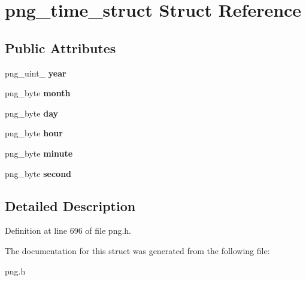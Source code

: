 \hypertarget{structpng__time__struct}{\section{png\+\_\+time\+\_\+struct Struct Reference}
\label{structpng__time__struct}
}
\subsection*{Public Attributes}
\begin{DoxyCompactItemize}
\item 
\hypertarget{structpng__time__struct_a5cceb6213fc7b4462435ea1d8fc1c798}{png\+\_\+uint\+\_ {\bfseries year}}\label{structpng__time__struct_a5cceb6213fc7b4462435ea1d8fc1c798}

\item 
\hypertarget{structpng__time__struct_a3ab550977ee2cb1165c0398131f2e601}{png\+\_\+byte {\bfseries month}}\label{structpng__time__struct_a3ab550977ee2cb1165c0398131f2e601}

\item 
\hypertarget{structpng__time__struct_afa0f94516a676178d1dabeb96eccdcdb}{png\+\_\+byte {\bfseries day}}\label{structpng__time__struct_afa0f94516a676178d1dabeb96eccdcdb}

\item 
\hypertarget{structpng__time__struct_a79ac8b217254fd87cdc7299e6612a6f4}{png\+\_\+byte {\bfseries hour}}\label{structpng__time__struct_a79ac8b217254fd87cdc7299e6612a6f4}

\item 
\hypertarget{structpng__time__struct_ad3ce11e9d92b77a33b3f7480bf0fff8c}{png\+\_\+byte {\bfseries minute}}\label{structpng__time__struct_ad3ce11e9d92b77a33b3f7480bf0fff8c}

\item 
\hypertarget{structpng__time__struct_a84e528e4c4c7d76cd2252e0d0d2ed0c9}{png\+\_\+byte {\bfseries second}}\label{structpng__time__struct_a84e528e4c4c7d76cd2252e0d0d2ed0c9}

\end{DoxyCompactItemize}


\subsection{Detailed Description}


Definition at line 696 of file png.\+h.



The documentation for this struct was generated from the following file\+:\begin{DoxyCompactItemize}
\item 
png.\+h\end{DoxyCompactItemize}
